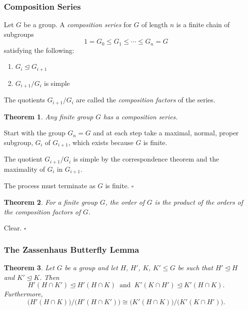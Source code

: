 \documentclass[10pt]{article}
\newtheorem{theorem}{Theorem}[section]
\newenvironment{proof}[1][Proof]{\begin{trivlist}
\item[\hskip \labelsep {\itshape #1}]}{\end{trivlist}}
\newenvironment{definition}[1][Definition]{\begin{trivlist}
\item[\hskip \labelsep {\bfseries #1}]}{\end{trivlist}}
\begin{document}
\subsubsection{Composition Series}

\begin{definition}
Let $G$ be a group. A \emph{composition series} for $G$ of length $n$ is a finite chain of subgroups
$$1 = G_0 \leq G_1 \leq \cdots \leq G_n = G$$
satisfying the following:
\begin{enumerate}
\item $G_i \mathrel{\unlhd} G_{i + 1}$
\item $G_{i+1}/G_i$ is simple
\end{enumerate}
The quotients $G_{i+1}/G_i$ are called the \emph{composition factors} of the series.
\end{definition}

\begin{theorem}
Any finite group $G$ has a composition series.
\end{theorem}

\begin{proof}
Start with the group $G_n = G$ and at each step take a maximal, normal, proper subgroup, $G_i$ of $G_{i+1}$, which exists because $G$ is finite.

The quotient $G_{i+1}/G_i$ is simple by the correspondence theorem and the maximality of $G_i$ in $G_{i+1}$.

The process must terminate as $G$ is finite. $\square$
\end{proof}

\begin{theorem}
For a finite group $G$, the order of $G$ is the product of the orders of the composition factors of $G$.
\end{theorem}

\begin{proof}
Clear. $\square$
\end{proof}

\subsubsection{The Zassenhaus Butterfly Lemma}

\begin{theorem}
Let $G$ be a group and let $H$, $H'$, $K$, $K' \leq G$ be such that $H' \mathrel{\unlhd} H$ and $K' \mathrel{\unlhd} K$. Then
$$H'(H\cap K') \mathrel{\unlhd} H'(H\cap K) \;\;\mbox{and}\;\; K'(K\cap H') \mathrel{\unlhd} K'(H\cap K).$$
Furthermore,
$$\bigl(H'(H\cap K)\bigr)/\bigl(H'(H\cap K')\bigr) \cong \bigl(K'(H\cap K) \bigr)/\bigl(K'(K\cap H')\bigr).$$
\end{theorem}
\end{document}
